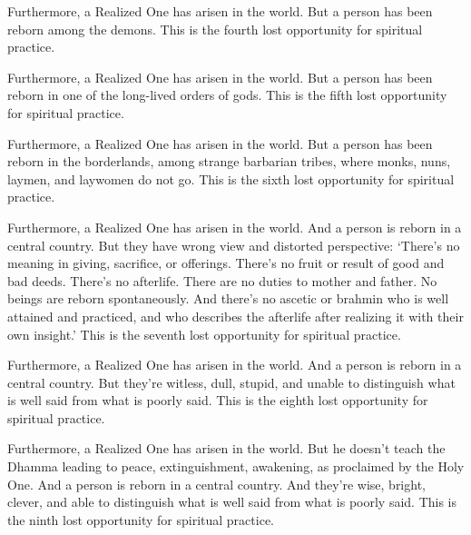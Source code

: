 \documentclass[12pt,openany]{book}%
\begin{document}
Furthermore, a Realized One has arisen in the world. But a person has been reborn among the demons. This is the fourth lost opportunity for spiritual practice. 

Furthermore, a Realized One has arisen in the world. But a person has been reborn in one of the long-lived orders of gods. This is the fifth lost opportunity for spiritual practice. 

Furthermore, a Realized One has arisen in the world. But a person has been reborn in the borderlands, among strange barbarian tribes, where monks, nuns, laymen, and laywomen do not go. This is the sixth lost opportunity for spiritual practice. 

Furthermore, a Realized One has arisen in the world. And a person is reborn in a central country. But they have wrong view and distorted perspective: ‘There’s no meaning in giving, sacrifice, or offerings. There’s no fruit or result of good and bad deeds. There’s no afterlife. There are no duties to mother and father. No beings are reborn spontaneously. And there’s no ascetic or brahmin who is well attained and practiced, and who describes the afterlife after realizing it with their own insight.’ This is the seventh lost opportunity for spiritual practice. 

Furthermore, a Realized One has arisen in the world. And a person is reborn in a central country. But they’re witless, dull, stupid, and unable to distinguish what is well said from what is poorly said. This is the eighth lost opportunity for spiritual practice. 

Furthermore, a Realized One has arisen in the world. But he doesn’t teach the Dhamma leading to peace, extinguishment, awakening, as proclaimed by the Holy One. And a person is reborn in a central country. And they’re wise, bright, clever, and able to distinguish what is well said from what is poorly said. This is the ninth lost opportunity for spiritual practice. 
\end{document}
